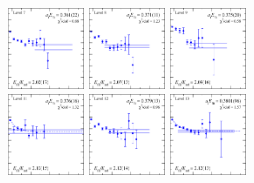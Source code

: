 \begin{figure}[H]
    \includegraphics[width=0.18\textwidth]{figures/sigmas/hg/fits/fit_11.pdf}
    \includegraphics[width=0.18\textwidth]{figures/sigmas/hg/fits/fit_14.pdf}
    \includegraphics[width=0.18\textwidth]{figures/sigmas/hg/fits/fit_30.pdf}\\
    \includegraphics[width=0.18\textwidth]{figures/sigmas/hg/fits/fit_3.pdf}
    \includegraphics[width=0.18\textwidth]{figures/sigmas/hg/fits/fit_8.pdf}
    \includegraphics[width=0.18\textwidth]{figures/sigmas/hg/fits/fit_9.pdf}

\end{figure}
